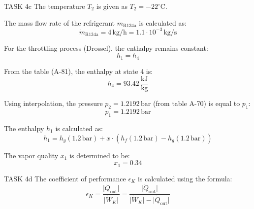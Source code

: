 TASK 4c  
The temperature \( T_2 \) is given as \( T_2 = -22^\circ\text{C} \).  

The mass flow rate of the refrigerant \( \dot{m}_{\text{R134a}} \) is calculated as:  
\[
\dot{m}_{\text{R134a}} = 4 \, \text{kg/h} = 1.1 \cdot 10^{-3} \, \text{kg/s}
\]

For the throttling process (Drossel), the enthalpy remains constant:  
\[
h_1 = h_4
\]

From the table (A-81), the enthalpy at state 4 is:  
\[
h_4 = 93.42 \, \frac{\text{kJ}}{\text{kg}}
\]

Using interpolation, the pressure \( p_2 = 1.2192 \, \text{bar} \) (from table A-70) is equal to \( p_1 \):  
\[
p_1 = 1.2192 \, \text{bar}
\]

The enthalpy \( h_1 \) is calculated as:  
\[
h_1 = h_g(1.2 \, \text{bar}) + x \cdot \left( h_f(1.2 \, \text{bar}) - h_g(1.2 \, \text{bar}) \right)
\]

The vapor quality \( x_1 \) is determined to be:  
\[
x_1 = 0.34
\]

TASK 4d  
The coefficient of performance \( \epsilon_K \) is calculated using the formula:  
\[
\epsilon_K = \frac{\lvert \dot{Q}_{\text{out}} \rvert}{\lvert \dot{W}_K \rvert} = \frac{\lvert \dot{Q}_{\text{out}} \rvert}{\lvert \dot{W}_K \rvert - \lvert \dot{Q}_{\text{out}} \rvert}
\]